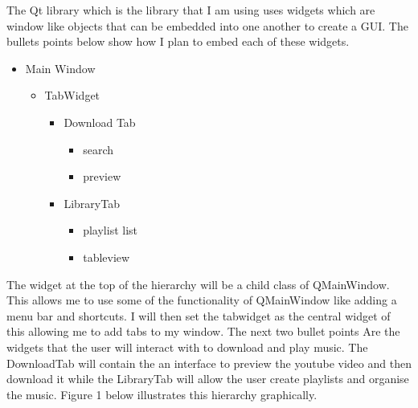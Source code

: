 \documentclass{article}
\begin{document}
The Qt library which is the library that I am using uses widgets which are window
like objects that can be embedded into one another to create a GUI. The bullets 
points below show how I plan to embed each of these widgets.

\begin{itemize}
    \item Main Window
        \begin{itemize}
            \item TabWidget
                \begin{itemize}
                    \item Download Tab
                        \begin{itemize}
                            \item search
                            \item preview
                        \end{itemize}
                    \item LibraryTab
                        \begin{itemize}
                            \item playlist list
                            \item tableview
                        \end{itemize}
                \end{itemize}
        \end{itemize}

\end{itemize}

The widget at the top of the hierarchy will be a child class of QMainWindow. This
allows me to use some of the functionality of QMainWindow like adding a menu bar
and shortcuts. I will then set the tabwidget as the central widget of this
allowing me to add tabs to my window. The next two bullet points Are the widgets
that the user will interact with to download and play music. The DownloadTab will
contain the an interface to preview the youtube video and then download it while
the LibraryTab will allow the user create playlists and organise the music. Figure 1
below illustrates this hierarchy graphically.
\end{document}
